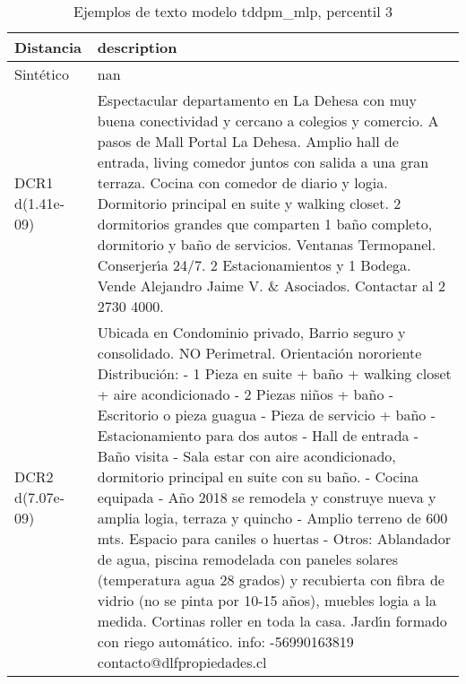 \begin{table}[H]
\centering
\fontsize{10}{14}\selectfont
\caption{Ejemplos de texto modelo tddpm\_mlp, percentil 3}
\label{table-example-economicos-a-3-tddpm_mlp-3p-text}
\begin{tabular}{|l|m{35em}|}
\hline
\rowcolor[gray]{0.8}
Distancia & description \\
\hline Sintético & nan \\
\hline DCR1 d(1.41e-09) & Espectacular departamento en La Dehesa con muy buena conectividad y cercano a colegios y comercio.
 A pasos de Mall Portal La Dehesa.  Amplio hall de entrada, living comedor juntos con salida a una gran terraza. Cocina con comedor de diario y logia.
 Dormitorio principal en suite y walking closet. 2 dormitorios grandes que comparten 1 ba\~no completo, dormitorio y ba\~no de servicios. Ventanas Termopanel. Conserjer{\'\i}a 24/7.  2 Estacionamientos y 1 Bodega. Vende Alejandro Jaime V. \& Asociados. Contactar al 2 2730 4000. \\
\hline DCR2 d(7.07e-09) & Ubicada en Condominio privado, Barrio seguro y consolidado. NO Perimetral.  Orientaci\'on nororiente Distribuci\'on: - 1 Pieza en suite + ba\~no + walking closet + aire acondicionado - 2 Piezas ni\~nos + ba\~no - Escritorio o pieza guagua - Pieza de servicio + ba\~no - Estacionamiento para dos autos - Hall de entrada - Ba\~no visita - Sala estar con aire acondicionado, dormitorio principal en suite con su ba\~no. - Cocina equipada - A\~no 2018 se remodela y construye nueva y amplia logia, terraza y quincho - Amplio terreno de 600 mts. Espacio para caniles o huertas - Otros: Ablandador de agua, piscina remodelada con paneles solares (temperatura agua 28 grados) y recubierta con fibra de vidrio (no se pinta por 10-15 a\~nos), muebles logia a la medida. Cortinas roller en toda la casa. Jard{\'\i}n formado con riego autom\'atico.  info: -56990163819 contacto@dlfpropiedades.cl \\
\hline
\end{tabular}
\end{table}
